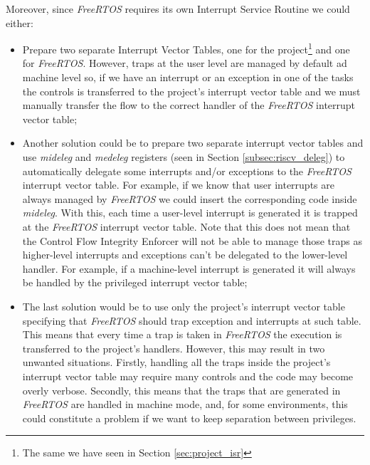 Moreover, since \textit{FreeRTOS} requires its own Interrupt Service Routine we could
either:
\begin{itemize}
  \item Prepare two separate Interrupt Vector Tables, one for the project\footnote{The
    same we have seen in Section \ref{sec:project_isr}} and one for \textit{FreeRTOS}.
    However, traps at the user level are managed by default ad machine level so,
    if we have an interrupt or an exception in one of the tasks the controls is transferred
    to the project's interrupt vector table and we must manually transfer the flow
    to the correct handler of the \textit{FreeRTOS} interrupt vector table;

  \item Another solution could be to prepare two separate interrupt vector tables
    and use \textit{mideleg} and \textit{medeleg} registers (seen in Section
    \ref{subsec:riscv_deleg}) to automatically delegate some interrupts and/or exceptions
    to the \textit{FreeRTOS} interrupt vector table. For example, if we know
    that user interrupts are always managed by \textit{FreeRTOS} we could insert
    the corresponding code inside \textit{mideleg}. With this, each time a user-level
    interrupt is generated it is trapped at the \textit{FreeRTOS} interrupt vector
    table. Note that this does not mean that the Control Flow Integrity Enforcer
    will not be able to manage those traps as higher-level interrupts and
    exceptions can't be delegated to the lower-level handler. For example, if a
    machine-level interrupt is generated it will always be handled by the
    privileged interrupt vector table;

  \item The last solution would be to use only the project's interrupt vector table
    specifying that \textit{FreeRTOS} should trap exception and interrupts at
    such table. This means that every time a trap is taken in \textit{FreeRTOS}
    the execution is transferred to the project's handlers. However, this may
    result in two unwanted situations. Firstly, handling all the traps inside
    the project's interrupt vector table may require many controls and the code
    may become overly verbose. Secondly, this means that the traps that are
    generated in \textit{FreeRTOS} are handled in machine mode, and, for some environments,
    this could constitute a problem if we want to keep separation between
    privileges.
\end{itemize}

